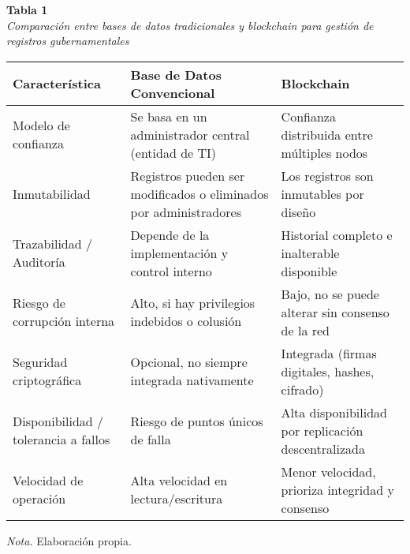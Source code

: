 \begin{table}[htbp]
    \begin{flushleft}
        \textbf{Tabla 1}\\[2em]
        \textit{Comparación entre bases de datos tradicionales y blockchain para gestión de registros gubernamentales}
    \end{flushleft}
    \vspace{1em}
    \centering
    \begin{tabular}{p{4.5cm} p{5.2cm} p{5.2cm}}
        \toprule
        \textbf{Característica} & \textbf{Base de Datos Convencional} & \textbf{Blockchain} \\
        \midrule
        Modelo de confianza & Se basa en un administrador central (entidad de TI) & Confianza distribuida entre múltiples nodos \\
        Inmutabilidad & Registros pueden ser modificados o eliminados por administradores & Los registros son inmutables por diseño \\
        Trazabilidad / Auditoría & Depende de la implementación y control interno & Historial completo e inalterable disponible \\
        Riesgo de corrupción interna & Alto, si hay privilegios indebidos o colusión & Bajo, no se puede alterar sin consenso de la red \\
        Seguridad criptográfica & Opcional, no siempre integrada nativamente & Integrada (firmas digitales, hashes, cifrado) \\
        Disponibilidad / tolerancia a fallos & Riesgo de puntos únicos de falla & Alta disponibilidad por replicación descentralizada \\
        Velocidad de operación & Alta velocidad en lectura/escritura & Menor velocidad, prioriza integridad y consenso \\
        \bottomrule
    \end{tabular}
    \vspace{2em}
    \begin{flushleft}
        \textit{Nota.} Elaboración propia.
    \end{flushleft}
    \label{tab:comparacion_bd_blockchain}
\end{table}
